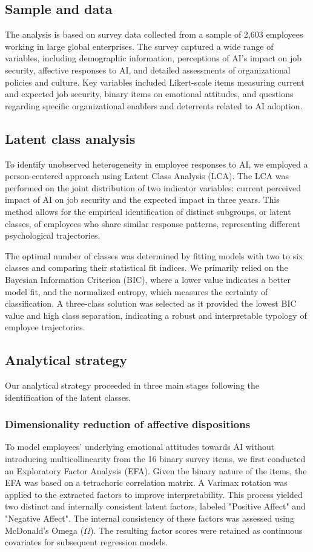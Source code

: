 \documentclass[]{article}
\begin{document}
\subsection{Sample and data}
The analysis is based on survey data collected from a sample of 2,603 employees working in large global enterprises. The survey captured a wide range of variables, including demographic information, perceptions of AI's impact on job security, affective responses to AI, and detailed assessments of organizational policies and culture. Key variables included Likert-scale items measuring current and expected job security, binary items on emotional attitudes, and questions regarding specific organizational enablers and deterrents related to AI adoption.

\subsection{Latent class analysis}
To identify unobserved heterogeneity in employee responses to AI, we employed a person-centered approach using Latent Class Analysis (LCA). The LCA was performed on the joint distribution of two indicator variables: current perceived impact of AI on job security and the expected impact in three years. This method allows for the empirical identification of distinct subgroups, or latent classes, of employees who share similar response patterns, representing different psychological trajectories.

The optimal number of classes was determined by fitting models with two to six classes and comparing their statistical fit indices. We primarily relied on the Bayesian Information Criterion (BIC), where a lower value indicates a better model fit, and the normalized entropy, which measures the certainty of classification. A three-class solution was selected as it provided the lowest BIC value and high class separation, indicating a robust and interpretable typology of employee trajectories.

\subsection{Analytical strategy}
Our analytical strategy proceeded in three main stages following the identification of the latent classes.

\subsubsection{Dimensionality reduction of affective dispositions}
To model employees' underlying emotional attitudes towards AI without introducing multicollinearity from the 16 binary survey items, we first conducted an Exploratory Factor Analysis (EFA). Given the binary nature of the items, the EFA was based on a tetrachoric correlation matrix. A Varimax rotation was applied to the extracted factors to improve interpretability. This process yielded two distinct and internally consistent latent factors, labeled "Positive Affect" and "Negative Affect". The internal consistency of these factors was assessed using McDonald's Omega ($\Omega$). The resulting factor scores were retained as continuous covariates for subsequent regression models.
\end{document}
